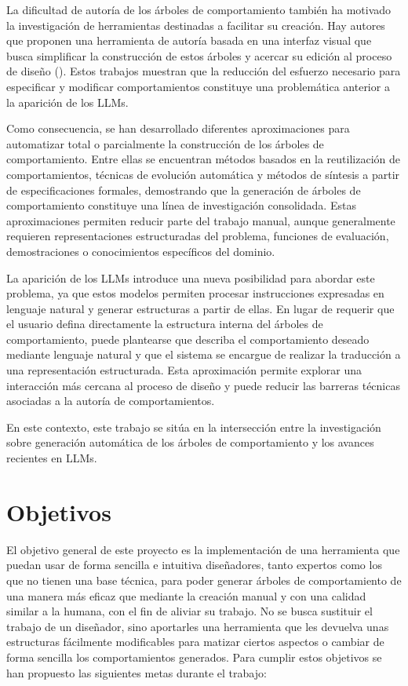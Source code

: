 La dificultad de autoría de los árboles de comportamiento también ha motivado la investigación de herramientas destinadas a facilitar su creación.
Hay autores que proponen una herramienta de autoría basada en una interfaz visual que busca simplificar la construcción de estos árboles y acercar su edición al proceso de diseño (\cite{AIPaint}).
Estos trabajos muestran que la reducción del esfuerzo necesario para especificar y modificar comportamientos constituye una problemática anterior a la aparición de los LLMs.

Como consecuencia, se han desarrollado diferentes aproximaciones para automatizar total o parcialmente la construcción de los árboles de comportamiento.
Entre ellas se encuentran métodos basados en la reutilización de comportamientos, técnicas de evolución automática y métodos de síntesis a partir de especificaciones formales, demostrando que la generación de árboles de comportamiento constituye una línea de investigación consolidada.
Estas aproximaciones permiten reducir parte del trabajo manual, aunque generalmente requieren representaciones estructuradas del problema, funciones de evaluación, demostraciones o conocimientos específicos del dominio.

La aparición de los LLMs introduce una nueva posibilidad para abordar este problema, ya que estos modelos permiten procesar instrucciones expresadas en lenguaje natural y generar estructuras a partir de ellas.
En lugar de requerir que el usuario defina directamente la estructura interna del árboles de comportamiento, puede plantearse que describa el comportamiento deseado mediante lenguaje natural y que el sistema se encargue de realizar la traducción a una representación estructurada.
Esta aproximación permite explorar una interacción más cercana al proceso de diseño y puede reducir las barreras técnicas asociadas a la autoría de comportamientos.

En este contexto, este trabajo se sitúa en la intersección entre la investigación sobre generación automática de los árboles de comportamiento y los avances recientes en LLMs.

\section{Objetivos}
\label{sec:Objetivos}

El objetivo general de este proyecto es la implementación de una herramienta que puedan usar de forma sencilla e intuitiva diseñadores, tanto expertos como los que no tienen una base técnica, para poder generar árboles de comportamiento de una manera más eficaz que mediante la creación manual y con una calidad similar a la humana, con el fin de aliviar su trabajo.
No se busca sustituir el trabajo de un diseñador, sino aportarles una herramienta que les devuelva unas estructuras fácilmente modificables para matizar ciertos aspectos o cambiar de forma sencilla los comportamientos generados.
Para cumplir estos objetivos se han propuesto las siguientes metas durante el trabajo:

